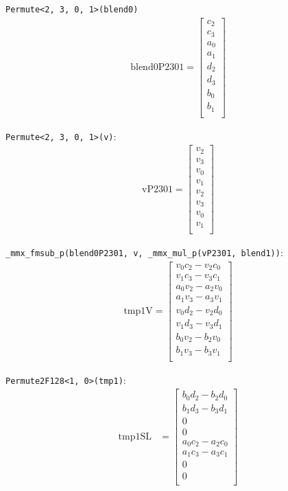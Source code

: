 \documentclass[]{scrartcl}
\begin{document}
\texttt{Permute<2, 3, 0, 1>(blend0)}
\begin{align*}
\mathrm{blend0P2301} 
=
\begin{bmatrix}
c_2\\
c_3\\
a_0\\
a_1\\
d_2\\
d_3\\
b_0\\
b_1\\
\end{bmatrix}
\end{align*}


\texttt{Permute<2, 3, 0, 1>(v)}:
\begin{align*}
\mathrm{vP2301} 
=
\begin{bmatrix}
v_2\\
v_3\\
v_0\\
v_1\\
v_2\\
v_3\\
v_0\\
v_1\\
\end{bmatrix}
\end{align*}

\texttt{_mmx_fmsub_p(blend0P2301, v, _mmx_mul_p(vP2301, blend1))}:
\begin{align*}
\mathrm{tmp1V} 
=
\begin{bmatrix}
v_0c_2 - v_2c_0\\
v_1c_3 - v_3c_1\\
a_0v_2 - a_2v_0\\
a_1v_3 - a_3v_1\\
v_0d_2 - v_2d_0\\
v_1d_3 - v_3d_1\\
b_0v_2 - b_2v_0\\
b_1v_3 - b_3v_1\\
\end{bmatrix}
\end{align*}


\texttt{Permute2F128<1, 0>(tmp1)}:
\begin{align*}
\mathrm{tmp1SL} 
&=
\begin{bmatrix}
	b_0d_2 - b_2d_0\\
	b_1d_3 - b_3d_1\\
	0\\
	0\\
	a_0c_2 - a_2c_0\\
	a_1c_3 - a_3c_1\\
	0\\
	0\\
\end{bmatrix}
\end{align*}
\end{document}
